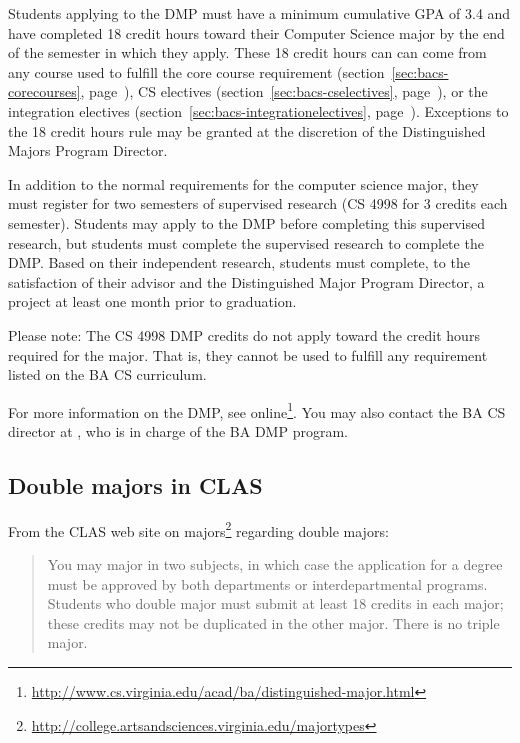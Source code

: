 \documentclass[10pt,letter,twocolumn]{book}
\newcommand{\myurl}[1]{\footnote{\scriptsize\url{#1}}}
\begin{document}
Students applying to the DMP must have a minimum cumulative GPA of 3.4
and have completed 18 credit hours toward their Computer Science major
by the end of the semester in which they apply. These 18 credit hours
can can come from any course used to fulfill the core course
requirement (section~\ref{sec:bacs-corecourses},
page~\pageref{sec:bacs-corecourses}), CS electives
(section~\ref{sec:bacs-cselectives},
page~\pageref{sec:bacs-cselectives}), or the integration electives
(section~\ref{sec:bacs-integrationelectives},
page~\pageref{sec:bacs-integrationelectives}).
Exceptions to the 18 credit hours rule may be granted at the
discretion of the Distinguished Majors Program Director.

In addition to the normal requirements for the computer science major,
they must register for two semesters of supervised research (CS 4998
for 3 credits each semester). Students may apply to the DMP before
completing this supervised research, but students must complete the
supervised research to complete the DMP. Based on their independent
research, students must complete, to the satisfaction of their advisor
and the Distinguished Major Program Director, a project at least one
month prior to graduation.

Please note: The CS 4998 DMP credits do not apply toward the credit
hours required for the major. That is, they cannot be used to fulfill
any requirement listed on the BA CS curriculum.

For more information on the DMP, see
online\myurl{http://www.cs.virginia.edu/acad/ba/distinguished-major.html}.
You may also contact the BA CS director at \bacsdirectoremail, who is
in charge of the BA DMP program.

\subsection{Double majors in CLAS}

From the CLAS web site on
majors\myurl{http://college.artsandsciences.virginia.edu/majortypes}
regarding double majors:

\begin{quotation}
\noindent You may major in two subjects, in which case the application
for a degree must be approved by both departments or inter\-departmental
programs. Students who double major must submit at least 18 credits in
each major; these credits may not be duplicated in the other
major. There is no triple major.
\end{quotation}
\end{document}
